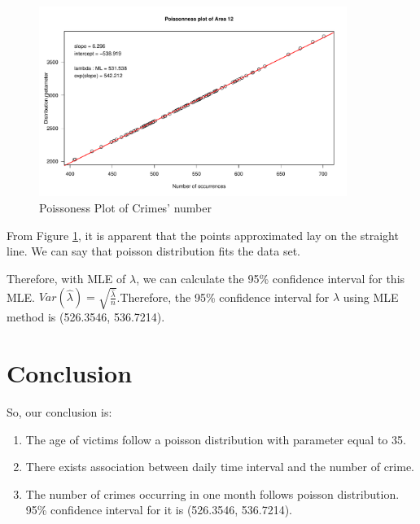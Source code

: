 \documentclass[UTF8]{article}
\begin{document}
\begin{figure}[htb]
    \includegraphics[width=10cm,height=6.18cm]{../image/6.pdf}
    \caption{Poissoness Plot of Crimes' number}\label{fig:poisson_Crime_number} 
\end{figure}


From Figure \ref{fig:poisson_Crime_number}, it is apparent that the points approximated lay on the straight line. We can say that poisson distribution fits the data set.

Therefore, with MLE of $\lambda$, we can calculate the 95\% confidence interval for this MLE. $Var(\hat{\lambda})=\sqrt{\frac{\hat{\lambda}}{n}}$.Therefore, the 95\% confidence interval for $\lambda$ using MLE method is (526.3546, 536.7214). 



\section{Conclusion}

So, our conclusion is:

\begin{enumerate}
    \item The age of victims follow a poisson distribution with parameter equal to 35.
    \item There exists association between daily time interval and the number of crime.
    \item The number of crimes occurring in one month follows poisson distribution. 95\% confidence interval for it is (526.3546, 536.7214).
\end{enumerate}
\end{document}
